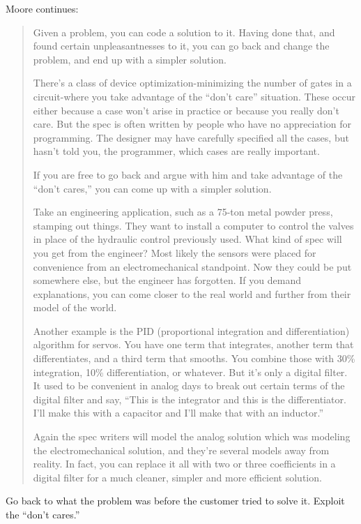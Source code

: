 \blackline{2ex}
\noindent Moore continues:
\begin{quotation}

\noindent Given a problem, you can code a solution to it. Having done that, and found
certain unpleasantnesses to it, you can go back and change the problem,
and end up with a simpler solution.

There's a class of device optimization-minimizing the number of gates in a
circuit-where you take advantage of the ``don't care'' situation. These
occur either because a case won't arise in practice or because you really
don't care. But the spec is often written by people who have no appreciation
for programming. The designer may have carefully specified all the cases,
but hasn't told you, the programmer, which cases are really important.

If you are free to go back and argue with him and take advantage of the
``don't cares,'' you can come up with a simpler solution.

Take an engineering application, such as a 75-ton metal powder press,
stamping out things. They want to install a computer to control the valves
in place of the hydraulic control previously used. What kind of spec will you
get from the engineer? Most likely the sensors were placed for convenience
from an electromechanical standpoint. Now they could be put somewhere
else, but the engineer has forgotten. If you demand explanations, you can
come closer to the real world and further from their model of the world.

Another example is the PID (proportional integration and differentiation)
algorithm for servos. You have one term that integrates, another term that
differentiates, and a third term that smooths. You combine those with
30\% integration, 10\% differentiation, or whatever. But it's only a digital
filter. It used to be convenient in analog days to break out certain terms of
the digital filter and say, ``This is the integrator and this is the
differentiator. I'll make this with a capacitor and I'll make that with an inductor.''

Again the spec writers will model the analog solution which was modeling
the electromechanical solution, and they're several models away from
reality. In fact, you can replace it all with two or three coefficients in a digital
filter for a much cleaner, simpler and more efficient solution.
\end{quotation}
\blackline{2ex}

\begin{tip}
Go back to what the problem was before the customer tried to solve it.
Exploit the ``don't cares.''
\end{tip}

